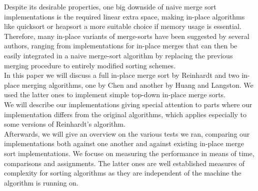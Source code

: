 \documentclass[11pt,pdftex,a4paper, twocolumn]{article}
\begin{document}
Despite its desirable properties, one big downside of naive merge sort implementations is the required linear extra space, making in-place algorithms like quicksort or heapsort a more suitable choice if memory usage is essential. \\
Therefore, many in-place variants of merge-sorts have been suggested by several authors, ranging from implementations for in-place merges that can then be easily integrated in a naive merge-sort algorithm by replacing the previous merging procedure to entirely modified sorting schemes. \\
In this paper we will discuss a full in-place merge sort by Reinhardt\cite{Reinhardt92} and two in-place merging algorithms, one by Chen\cite{Chen06} and another by Huang and Langston\cite{huang1988practical}. We used the latter ones to implement simple top-down in-place merge sorts. \\
We will describe our implementations giving special attention to parts where our implementation differs from the original algorithms, which applies especially to some versions of Reinhardt’s algorithm. \\
Afterwards, we will give an overview on the various tests we ran, comparing our implementations both against one another and against existing in-place merge sort implementations. We focuse on measuring the performance in means of time, comparisons and assignments. The latter ones are well established measures of complexity for sorting algorithms as they are independent of the machine the algorithm is running on. 
\end{document}
